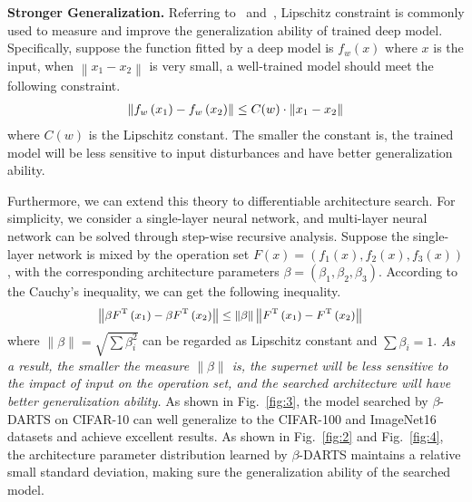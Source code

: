 \documentclass[10pt,twocolumn,letterpaper]{article}
\begin{document}
\noindent\textbf{Stronger Generalization.} Referring to~\cite{neyshabur2017exploring} and~\cite{finlay2018lipschitz}, Lipschitz constraint is commonly used to measure and improve the generalization ability of trained deep model. Specifically, suppose the function fitted by a deep model is $f_{w}\left(x\right)$ where $x$ is the input, when $\left\|x_{1}-x_{2}\right\|$ is very small, a well-trained model should meet the following constraint.
\begin{equation} \label{eqn15}
  \begin{split}
    \left\|f_{w}\left(x_{1}\right)-f_{w}\left(x_{2}\right)\right\| \leq C(w) \cdot\left\|x_{1}-x_{2}\right\|
  \end{split}
  \vspace{-6pt}
\end{equation}
where $C(w)$ is the Lipschitz constant. The smaller the constant is, the trained model will be less sensitive to input disturbances and have better generalization ability. 

Furthermore, we can extend this theory to differentiable architecture search. For simplicity, we consider a single-layer neural network, and multi-layer neural network can be solved through step-wise recursive analysis. Suppose the single-layer network is mixed by the operation set $F(x)=\left(f_{1}(x),f_{2}(x),f_{3}(x)\right)$, with the corresponding architecture parameters $\beta=\left(\beta_{1}, \beta_{2}, \beta_{3}\right)$. According to the Cauchy's inequality, we can get the following inequality.
\begin{equation} \label{eqn16}
\small
  \begin{split}
    &\left\|\beta F^\mathrm{T}\left(x_{1}\right)-\beta F^\mathrm{T}\left(x_{2}\right)\right\| \leq\|\beta \|\left\|F^\mathrm{T}\left(x_{1}\right)-F^\mathrm{T}\left(x_{2}\right)\right\| 
  \end{split}
  \vspace{-6pt}
\end{equation}
where $\|\beta\|=\sqrt{\sum \beta_{i}^{2}}$ can be regarded as Lipschitz constant and $\sum \beta_{i}=1$. \textit{As a result, the smaller the measure $\|\beta\|$ is, the supernet will be less sensitive to the impact of input on the operation set, and the searched architecture will have better generalization ability.} As shown in Fig.~\ref{fig:3}, the model searched by $\beta$-DARTS on CIFAR-10 can well generalize to the CIFAR-100 and ImageNet16 datasets and achieve excellent results. As shown in Fig.~\ref{fig:2} and Fig.~\ref{fig:4}, the architecture parameter distribution learned by $\beta$-DARTS maintains a relative small standard deviation, making sure the generalization ability of the searched model.
\end{document}
